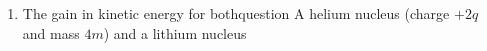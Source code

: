 \documentclass{../oss-handout}
\begin{document}
\begin{enumerate}[leftmargin=17pt]
\item The gain in kinetic energy for bothquestion A helium nucleus (charge $+2q$ and mass $4m$) and a lithium nucleus

\end{enumerate}
\end{document}

